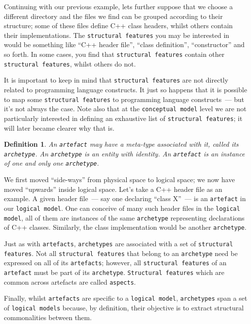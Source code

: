 \documentclass{book}
\newtheorem{concept}{Definition}
\begin{document}
Continuing with our previous example, lets further suppose that we
choose a different directory and the files we find can be grouped
according to their structure; some of these files define C++ class
headers, whilst others contain their implementations. The
\texttt{structural features} you may be interested in would be
something like ``C++ header file'', ``class definition'',
``constructor'' and so forth. In some cases, you find that
\texttt{structural features} contain other \texttt{structural
  features}, whilst others do not.

It is important to keep in mind that \texttt{structural features} are
not directly related to programming language constructs. It just so
happens that it is possible to map some \texttt{structural features}
to programming language constructs~--- but it's not always the
case. Note also that at the \texttt{conceptual model} level we are not
particularly interested in defining an exhaustive list of
\texttt{structural features}; it will later became clearer why that
is.

\begin{concept}
An \texttt{artefact} may have a meta-type associated with it, called
its \texttt{archetype}. An \texttt{archetype} is an entity with
identity. An \texttt{artefact} is an instance of one and only one
\texttt{archetype}.
\end{concept}

We first moved ``side-ways'' from physical space to logical space; we
now have moved ``upwards'' inside logical space. Let's take a C++
header file as an example. A given header file~--- say one declaring
``class X''~--- is an \texttt{artefact} in our \texttt{logical
  model}. One can conceive of many such header files in the
\texttt{logical model}, all of them are instances of the same
\texttt{archetype} representing declarations of C++
classes. Similarly, the class implementation would be another
\texttt{archetype}.

Just as with \texttt{artefacts}, \texttt{archetypes} are associated
with a set of \texttt{structural features}. Not all \texttt{structural
  features} that belong to an \texttt{archetype} need be expressed on
all of its \texttt{artefacts}; however, all \texttt{structural
  features} of an \texttt{artefact} must be part of its
\texttt{archetype}. \texttt{Structural features} which are common
across artefacts are called \texttt{aspects}.

Finally, whilst \texttt{artefacts} are specific to a \texttt{logical
  model}, \texttt{archetypes} span a set of \texttt{logical models}
because, by definition, their objective is to extract structural
commonalities between them.
\end{document}
